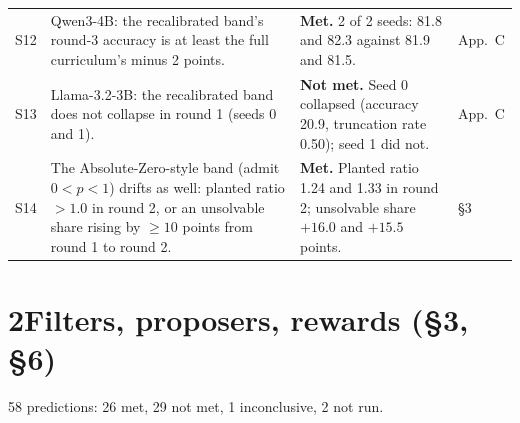 \documentclass[10pt,a4paper]{article}
\newcommand{\met}{\textbf{Met.}}
\newcommand{\nmet}{\textbf{Not met.}}
\begin{document}
\begin{longtable}{@{}L{0.9cm}L{7.8cm}L{6.1cm}L{1.3cm}@{}}
S12 & Qwen3-4B: the recalibrated band's round-3 accuracy is at least the full curriculum's minus 2 points. & \met{} 2 of 2 seeds: 81.8 and 82.3 against 81.9 and 81.5. & App.~C \\
S13 & Llama-3.2-3B: the recalibrated band does not collapse in round 1 (seeds 0 and 1). & \nmet{} Seed 0 collapsed (accuracy 20.9, truncation rate 0.50); seed 1 did not. & App.~C \\
S14 & The Absolute-Zero-style band (admit $0 < p < 1$) drifts as well: planted ratio $> 1.0$ in round 2, or an unsolvable share rising by $\ge 10$ points from round 1 to round 2. & \met{} Planted ratio 1.24 and 1.33 in round 2; unsolvable share $+16.0$ and $+15.5$ points. & \S3 \\
\end{longtable}
\endgroup

\section*{2\quad Filters, proposers, rewards (\S3, \S6)}
58 predictions: 26 met, 29 not met, 1 inconclusive, 2 not run.
\end{document}

